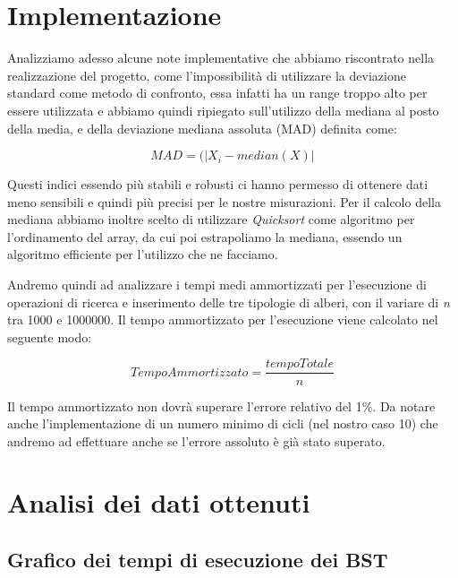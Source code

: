 \documentclass[a4paper,titlepage]{article}
\begin{document}
\section{Implementazione}
Analizziamo adesso alcune note implementative che abbiamo riscontrato nella realizzazione del progetto, come l’impossibilità di utilizzare la deviazione standard come metodo di confronto, essa infatti ha un range troppo alto per essere utilizzata e abbiamo quindi ripiegato sull’utilizzo della mediana al posto della media, e della deviazione mediana assoluta (MAD) definita come:

\[MAD = (|X_i - median(X)|\]

Questi indici essendo più stabili e robusti ci hanno permesso di ottenere dati meno sensibili e quindi più precisi per le nostre misurazioni.
Per il calcolo della mediana abbiamo inoltre scelto di utilizzare \textit{Quicksort} come algoritmo per l’ordinamento del array, da cui poi estrapoliamo la mediana, essendo un algoritmo efficiente per l’utilizzo che ne facciamo. 

Andremo quindi ad analizzare i tempi medi ammortizzati per l’esecuzione di  operazioni di ricerca e inserimento delle tre tipologie di alberi, con il variare di \textit{n} tra 1000 e 1000000.
Il tempo ammortizzato per l’esecuzione viene calcolato nel seguente modo: 

\[Tempo Ammortizzato = \frac{tempoTotale}{n}\]

Il tempo ammortizzato non dovrà superare l’errore relativo del 1\%.
Da notare anche l’implementazione di un numero minimo di cicli (nel nostro caso 10) che andremo ad effettuare anche se l’errore assoluto è già stato superato.
\newpage

\section{Analisi dei dati ottenuti}

\subsection{Grafico dei tempi di esecuzione dei BST}
\end{document}
